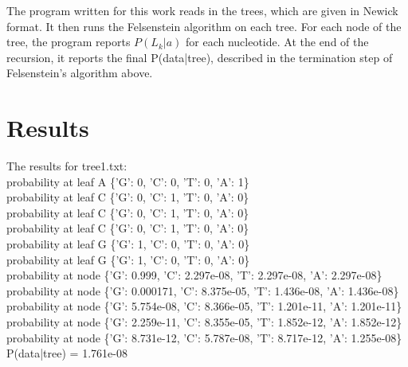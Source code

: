 \documentclass{acm_proc_article-sp}
\begin{document}
The program written for this work reads in the trees, which are given in Newick format.  It then runs the Felsenstein algorithm on each tree.  For each node of the tree, the program reports $P(L_k |a)$ for each nucleotide.  At the end of the recursion, it reports the final P(data|tree), described in the termination step of Felsenstein's algorithm above.  


\section{Results}
The results for tree1.txt: \\
probability at leaf A \{'G': 0, 'C': 0, 'T': 0, 'A': 1\}\\
probability at leaf C \{'G': 0, 'C': 1, 'T': 0, 'A': 0\}\\
probability at leaf C \{'G': 0, 'C': 1, 'T': 0, 'A': 0\}\\
probability at leaf C \{'G': 0, 'C': 1, 'T': 0, 'A': 0\}\\
probability at leaf G \{'G': 1, 'C': 0, 'T': 0, 'A': 0\}\\
probability at leaf G \{'G': 1, 'C': 0, 'T': 0, 'A': 0\}\\
probability at node \{'G': 0.999, 'C': 2.297e-08, 'T': 2.297e-08, 'A': 2.297e-08\}\\
probability at node \{'G': 0.000171, 'C': 8.375e-05, 'T': 1.436e-08, 'A': 1.436e-08\}\\
probability at node \{'G': 5.754e-08, 'C': 8.366e-05, 'T': 1.201e-11, 'A': 1.201e-11\}\\
probability at node \{'G': 2.259e-11, 'C': 8.355e-05, 'T': 1.852e-12, 'A': 1.852e-12\}\\
probability at node \{'G': 8.731e-12, 'C': 5.787e-08, 'T': 8.717e-12, 'A': 1.255e-08\}\\
P(data|tree) = 1.761e-08
\end{document}
